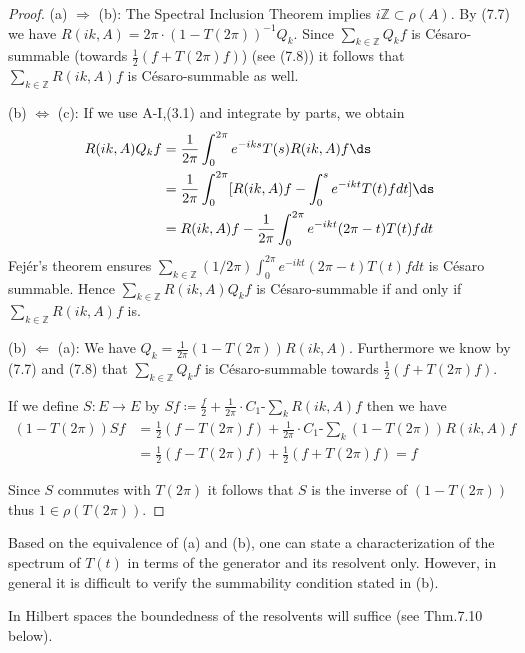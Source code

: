 \begin{proof}
(a) $\Rightarrow$ (b): The Spectral Inclusion Theorem implies $i\mathbb{Z} \subset \rho(A)$.
By (7.7) we have $R(ik,A) = 2\pi\cdot(1-T(2\pi))^{-1}Q_{k}$.
Since $\sum_{k\in\mathbb{Z}} Q_{k}f$ is Césaro-summable (towards $\frac{1}{2}(f + T(2\pi)f)$) (see (7.8)) it follows that $\sum_{k\in\mathbb{Z}} R(ik,A)f$ is Césaro-summable as well.

(b) $\Leftrightarrow$ (c): If we use A-I,(3.1) and integrate by parts, we obtain
\begin{align*}
R(ik,A)Q_{k}f &= \frac{1}{2\pi}\int_{0}^{2\pi} e^{-iks} T(s)R(ik,A)f \ds \\
&= \frac{1}{2\pi}\int_{0}^{2\pi} [R(ik,A)f - \int_{0}^{s} e^{-ikt} T(t)f dt] \ds \\
&= R(ik,A)f - \frac{1}{2\pi}\int_{0}^{2\pi} e^{-ikt} (2\pi-t) T(t)f dt
\end{align*}
Fejér's theorem ensures $\sum_{k\in\mathbb{Z}} (1/2\pi)\int_{0}^{2\pi} e^{-ikt} (2\pi-t) T(t)f dt$ is Césaro summable.
Hence $\sum_{k\in\mathbb{Z}} R(ik,A)Q_{k}f$ is Césaro-summable if and only if $\sum_{k\in\mathbb{Z}} R(ik,A)f$ is.

(b) $\Leftarrow$ (a): We have $Q_{k} = \frac{1}{2\pi}(1 - T(2\pi))R(ik,A)$.
Furthermore we know by (7.7) and (7.8) that $\sum_{k\in\mathbb{Z}} Q_{k}f$ is Césaro-summable towards $\frac{1}{2}(f + T(2\pi)f)$.

If we define $S \colon E \to E$ by $Sf \coloneqq \frac{f}{2} + \frac{1}{2\pi}\cdot C_{1}\text{-}\sum_k R(ik,A)f$ then we have
\begin{align*}
(1 - T(2\pi))Sf &= \frac{1}{2}(f - T(2\pi)f) + \frac{1}{2\pi}\cdot C_{1}\text{-}\sum_k (1 - T(2\pi))R(ik,A)f \\
&= \frac{1}{2}(f - T(2\pi)f) + \frac{1}{2}(f + T(2\pi)f) = f
\end{align*}

Since $S$ commutes with $T(2\pi)$ it follows that $S$ is the inverse of $(1 - T(2\pi))$ thus $1 \in \rho(T(2\pi))$.
\end{proof}

Based on the equivalence of (a) and (b), one can state a characterization of the spectrum of $T(t)$ in terms of the generator and its resolvent only.
However, in general it is difficult to verify the summability condition stated in (b).

In Hilbert spaces the boundedness of the resolvents will suffice (see Thm.7.10 below).

